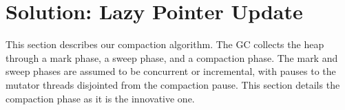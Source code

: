 \documentclass[sigplan,10pt,review,anonymous]{acmart}\settopmatter{printfolios=true,printccs=false,printacmref=false}
\begin{document}
%
%


\section{Solution: Lazy Pointer Update}
\label{sec:solution}

This section describes our compaction algorithm. The GC collects the heap through a mark phase, a sweep phase, and a compaction phase. The mark and sweep phases are assumed to be concurrent or incremental, with pauses to the mutator threads disjointed from the compaction pause.
This section details the compaction phase as it is the innovative one.
 
\end{document}
